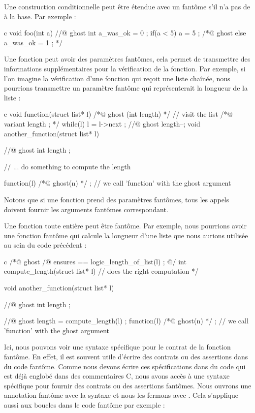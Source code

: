 Une construction conditionnelle  peut être étendue avec un
 fantôme s'il n'a pas de  à la base. Par
exemple :


\begin{CodeBlock}{c}
void foo(int a){
  //@ ghost int a_was_ok = 0 ;
  if(a < 5){
    a = 5 ;
  } /*@ ghost else {
    a_was_ok = 1 ;
  } */
}
\end{CodeBlock}


Une fonction peut avoir des paramètres fantômes, cela permet de transmettre des
informations supplémentaires pour la vérification de la fonction. Par exemple,
si l'on imagine la vérification d'une fonction qui reçoit une liste chaînée,
nous pourrions transmettre un paramètre fantôme qui représenterait la
longueur de la liste :


\begin{CodeBlock}{c}
void function(struct list* l) /*@ ghost (int length) */ {
  // visit the list
  /*@ variant length ; */
  while(l){
    l = l->next ;
    //@ ghost length--;
  }
}
void another_function(struct list* l){
  //@ ghost int length ;

  // ... do something to compute the length

  function(l) /*@ ghost(n) */ ; // we call 'function' with the ghost argument
}
\end{CodeBlock}


Notons que si une fonction prend des paramètres fantômes, tous les appels doivent
fournir les arguments fantômes correspondant.


Une fonction toute entière peut être fantôme. Par exemple, nous pourrions avoir
une fonction fantôme qui calcule la longueur d'une liste que nous aurions utilisée
au sein du code précédent :

\begin{CodeBlock}{c}
/*@ ghost
  /@ ensures \result == logic_length_of_list(l) ; @/
  int compute_length(struct list* l){
    // does the right computation
  }
*/

void another_function(struct list* l){
  //@ ghost int length ;

  //@ ghost length = compute_length(l) ;
  function(l) /*@ ghost(n) */ ; // we call 'function' with the ghost argument
}
\end{CodeBlock}


Ici, nous pouvons voir une syntaxe spécifique pour le contrat de la fonction
fantôme. En effet, il est souvent utile d'écrire des contrats ou des assertions
dans du code fantôme. Comme nous devons écrire ces spécifications dans du code
qui est déjà englobé dans des commentaires C, nous avons accès à une syntaxe
spécifique pour fournir des contrats ou des assertions fantômes. Nous ouvrons
une annotation fantôme avec la syntaxe  et nous les fermons avec
. Cela s'applique aussi aux boucles dans le code fantôme par
exemple :


